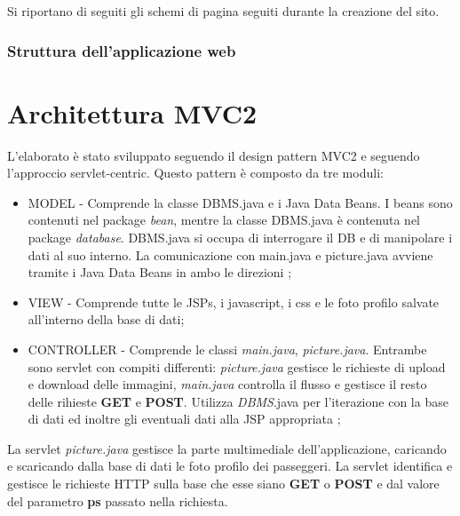 \documentclass[a4paper,10pt]{article}
\begin{document}
Si riportano di seguiti gli schemi di pagina seguiti durante la creazione del sito.

\section{Struttura dell'applicazione web}

\part{Architettura MVC2}
L'elaborato \`e stato sviluppato seguendo il design pattern MVC2 e seguendo l'approccio servlet-centric. Questo pattern \`e composto da tre moduli:

\begin{itemize}
 \item MODEL -  Comprende la classe DBMS.java e i Java Data Beans. I beans sono contenuti nel package \textit{bean}, mentre la classe DBMS.java \`e contenuta nel 
		package \textit{database}. DBMS.java si occupa di interrogare il DB e di manipolare i dati al suo interno. 
		La comunicazione con main.java e picture.java  avviene tramite i 
		Java Data Beans in ambo le direzioni ;
 \item VIEW - Comprende tutte le JSPs, i javascript, i css e le foto profilo salvate all'interno della base di dati;
 \item CONTROLLER - Comprende le classi \textit{main.java}, \textit{picture.java}. Entrambe sono servlet con compiti differenti: \textit{picture.java} gestisce le richieste di upload e download delle
		    immagini, \textit{main.java} controlla il flusso e gestisce il resto delle rihieste \textbf{GET} e \textbf{POST}. Utilizza \textit{DBMS}.java per l'iterazione con la base di dati ed inoltre 
		    gli eventuali dati alla JSP appropriata ;
\end{itemize}

La servlet \textit{picture.java} gestisce la parte multimediale dell'applicazione, caricando e scaricando dalla base di dati le foto profilo dei passeggeri.
La servlet identifica e gestisce le richieste HTTP sulla base che esse siano \textbf{GET} o \textbf{POST} e dal valore del parametro \textbf{ps} passato nella richiesta.
\end{document}
